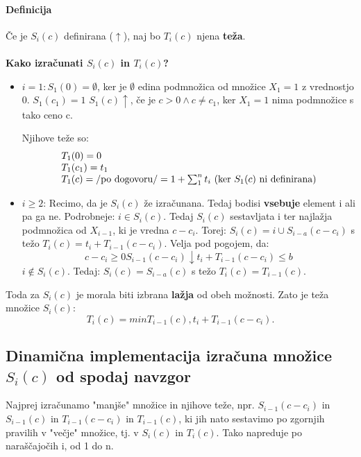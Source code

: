 \documentclass[a4paper,10pt]{article}
\begin{document}

\paragraph{Definicija}
\v Ce je $S_i(c)$ definirana ($\uparrow$), naj bo $T_i(c)$ njena \textbf{te\v za}.\\
\\
\textbf{Kako izra\v cunati $S_i(c)$ in $T_i(c)$?}
\begin{itemize}
\item $i=1: S_1(0) = \emptyset$, ker je $\emptyset$ edina podmno\v zica od mno\v zice $X_1 = {1}$ z vrednostjo 0.
	$S_1(c_1) = {1}$
	$S_1(c) \uparrow$, \v ce je $c>0 \wedge c \neq c_1$, ker $X_1={1}$ nima podmno\v zice s tako ceno c.

Njihove te\v ze so:
$$
\begin{array}{l}
T_1(0) = 0	\\
T_1(c_1) = t_1	\\
T_1(c) = \left /\mbox{po dogovoru} \right / = 1 + \sum_1^{n}t_i \mbox{ (ker } S_1(c) \mbox{ ni definirana)}	\\
\end{array}
$$

\item $i \geq 2$: Recimo, da je $S_i(c)$ \v ze izra\v cunana. Tedaj bodisi \textbf{vsebuje} element i ali pa ga ne.
Podrobneje:
	\subitem $i \in S_i(c)$. Tedaj $S_i(c)$ sestavljata i ter najla\v zja podmno\v zica od $X_{i-1}$, ki je vredna $c - c_i$.
	Torej: $S_i(c) = {i} \cup S_{i-a}(c-c_i)$ s te\v zo $T_i(c) = t_i + T_{i-1}(c - c_i)$. Velja pod pogojem, da:
	$$
	c - c_i \geq 0
	S_{i-1}(c-c_i) \downarrow
	t_i + T_{i-1}(c-c_i) \leq b
	$$
	\subitem $i \notin S_i(c)$. Tedaj: $S_i(c) = S_{i-a}(c)$ s te\v zo $T_i(c) = T_{i-1}(c)$.
\end{itemize}
Toda za $S_i(c)$ je morala biti izbrana \textbf{la\v zja} od obeh mo\v znosti. Zato je te\v za mno\v zice $S_i(c)$:
$$
T_i(c) = min{T_{i-1}(c), t_i + T_{i-1}(c - c_i)} \mbox{.}
$$

\subsection{Dinami\v cna implementacija izra\v cuna mno\v zice $S_i(c)$ od spodaj navzgor}

Najprej izra\v cunamo "manj\v se" mno\v zice in njihove te\v ze, npr. $S_{i-1}(c-c_i)$ in $S_{i-1}(c)$ in $T_{i-1}(c-c_i)$ in $T_{i-1}(c)$, ki jih nato sestavimo po zgornjih pravilih v "ve\v cje" mno\v zice, tj. v $S_i(c)$ in $T_i(c)$. Tako napreduje po nara\v s\v cajo\v cih i, od 1 do n.
\end{document}
